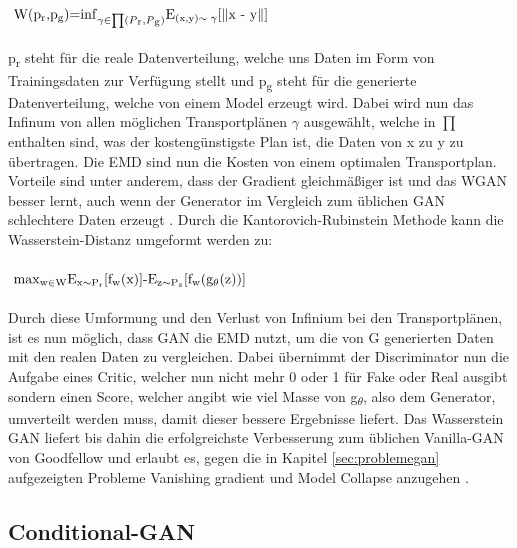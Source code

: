 \documentclass{llncs}
\begin{document}
\begin{math} 
$
W(p\textsubscript{r},p\textsubscript{g})=$\inf_{\gamma\in\prod(P\textsubscript{r},P\textsubscript{g})}$E\textsubscript{(x,y)$\sim\gamma$}[$\parallel$x - y$\parallel$]
$
\end{math}
\\\\
p\textsubscript{r} steht für die reale Datenverteilung, welche uns Daten im Form von Trainingsdaten zur Verfügung stellt und p\textsubscript{g} steht für die generierte Datenverteilung, welche von einem Model erzeugt wird. Dabei wird nun das Infinum von allen möglichen Transportplänen $\gamma$ ausgewählt, welche in $\prod$ enthalten sind, was der kostengünstigste Plan ist, die Daten von x zu y zu übertragen. Die EMD sind nun die Kosten von einem optimalen Transportplan. Vorteile sind unter anderem, dass der Gradient gleichmäßiger ist und das WGAN besser lernt, auch wenn der Generator  im Vergleich zum üblichen GAN schlechtere Daten erzeugt \cite{wasser}. Durch die Kantorovich-Rubinstein Methode kann die Wasserstein-Distanz umgeformt werden zu:
\\\\
\begin{math} 
$
$\max$\textsubscript{w$\in$W}E\textsubscript{x$\sim$P\textsubscript{r}}[f\textsubscript{w}(x)]-E\textsubscript{z$\sim$P\textsubscript{z}}[f\textsubscript{w}(g\textsubscript{$\theta$}(z))]
$
\end{math}
\\\\
Durch diese Umformung und den Verlust von Infinium bei den Transportplänen, ist es nun möglich, dass GAN die EMD nutzt, um die von G generierten Daten mit den realen Daten zu vergleichen. Dabei übernimmt der Discriminator nun die Aufgabe eines Critic, welcher nun nicht mehr 0 oder 1 für Fake oder Real ausgibt sondern einen Score, welcher angibt wie viel Masse von  g\textsubscript{$\theta$}, also dem Generator, umverteilt werden muss, damit dieser bessere Ergebnisse liefert. Das Wasserstein GAN liefert bis dahin die erfolgreichste Verbesserung zum üblichen Vanilla-GAN von Goodfellow und erlaubt es, gegen die in Kapitel \ref{sec:problemegan} aufgezeigten Probleme Vanishing gradient und Model Collapse anzugehen \cite{wasser}. 
\newpage
\subsection{Conditional-GAN}\label{sec:cgan}
\end{document}
